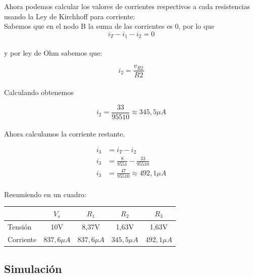 \documentclass[a4paper,12pt]{article}
\begin{document}
Ahora podemos calcular los valores de corrientes respectivos a cada resistencias usando la Ley de Kirchhoff para corriente:\\

Sabemos que en el nodo  B la suma de las corrientes es 0, por lo que\\

$$i_T - i_1 - i_2 = 0$$ \\

y por ley de Ohm sabemos que:

$$i_2 = \frac{v_{R2}}{R2}$$\\

Calculando obtenemos

$$i_2 = \frac{33}{95510} \approx 345,5\mu A$$\\

Ahora calculamos la corriente restante.

\begin{align*}
    i_3 &= i_T - i_2 \\[0.5cm]
    i_3 &= \frac{8}{9551} - \frac{33}{95510}\\[0.5cm]
    i_3 &= \frac{47}{95510} \approx 492,1 \mu A
\end{align*}

\paragraph{}

Resumiendo en un cuadro:\\

\vspace{0.5cm}


\begin{table}[h]  %
\centering
\begin{tabular}{|l|c|c|c|c|}
\hline
                &  $V_s$&  $R_1$&  $R_2$& $R_3$\\ \hline  
         Tensión&  10V&  8,37V&  1,63V& 1,63V\\ \hline  
         Corriente&  $837,6 \mu A$&  $837,6 \mu A$&  $345,5 \mu A$& $492,1 \mu A$\\ \hline 
\end{tabular}
\end{table}

\vspace{0.5cm}

\subsection{Simulación}
\end{document}

